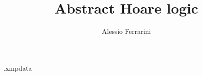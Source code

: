 \documentclass[
  10pt,       %
  twoside,    %
  a4paper,    %
  english,    %
  tikz,       %
  openright,  %
]{book}
\begin{document}
\frontmatter

\newcommand{\myName}{Alessio Ferrarini}
\newcommand{\myTitle}{Abstract Hoare logic}
\newcommand{\myDegree}{Master degree thesis}
\newcommand{\myUni}{University of Padova}
\newcommand{\myFaculty}{Master degree in Computer Science}
\newcommand{\myDepartment}{Department of Mathematics ``Tullio Levi-Civita''}
\newcommand{\profTitle}{Prof.}
\newcommand{\myProf}{Francesco Ranzato}
\newcommand{\myCoProf}{Paolo Baldan}
\newcommand{\myLocation}{Padova}
\newcommand{\myAA}{2023--2024}
\newcommand{\myTime}{April}

\title{\myTitle}
\author{\myName}

\begin{filecontents*}{\jobname.xmpdata}
\end{filecontents*}


\end{document}
